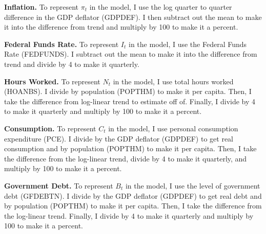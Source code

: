 \textbf{Inflation.}
To represent $\pi_t$ in the model, I use the log quarter to quarter difference in the GDP deflator (GDPDEF). I then subtract out the mean to make it into the difference from trend and multiply by 100 to make it a percent.

\textbf{Federal Funds Rate.}
To represent $I_t$ in the model, I use the Federal Funds Rate (FEDFUNDS). I subtract out the mean to make it into the difference from trend and divide by 4 to make it quarterly.

\textbf{Hours Worked.}
To represent $N_t$ in the model, I use total hours worked (HOANBS). I divide by population (POPTHM) to make it per capita. Then, I take the difference from log-linear trend to estimate off of. Finally, I divide by 4 to make it quarterly and multiply by 100 to make it a percent.

\textbf{Consumption.}
To represent $C_t$ in the model, I use personal consumption expenditure (PCE). I divide by the GDP deflator (GDPDEF) to get real consumption and by population (POPTHM) to make it per capita. Then, I take the difference from the log-linear trend, divide by 4 to make it quarterly, and multiply by 100 to make it a percent.

\textbf{Government Debt.}
To represent $B_t$ in the model, I use the level of government debt (GFDEBTN). I divide by the GDP deflator (GDPDEF) to get real debt and by population (POPTHM) to make it per capita. Then, I take the difference from the log-linear trend. Finally, I divide by 4 to make it quarterly and multiply by 100 to make it a percent.
